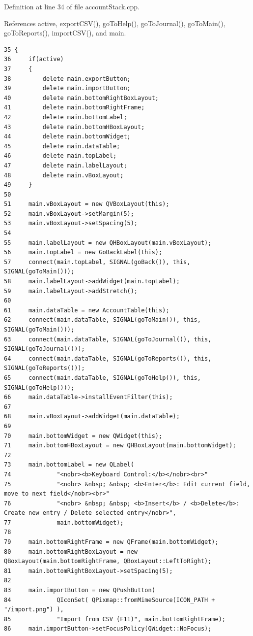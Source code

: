 Definition at line 34 of file account\-Stack.cpp.

References active, export\-CSV(), go\-To\-Help(), go\-To\-Journal(), go\-To\-Main(), go\-To\-Reports(), import\-CSV(), and main.

\footnotesize\begin{verbatim}35 {
36     if(active)
37     {
38         delete main.exportButton;
39         delete main.importButton;
40         delete main.bottomRightBoxLayout;
41         delete main.bottomRightFrame;
42         delete main.bottomLabel;
43         delete main.bottomHBoxLayout;
44         delete main.bottomWidget;
45         delete main.dataTable;
46         delete main.topLabel;
47         delete main.labelLayout;
48         delete main.vBoxLayout;
49     }
50     
51     main.vBoxLayout = new QVBoxLayout(this);
52     main.vBoxLayout->setMargin(5);
53     main.vBoxLayout->setSpacing(5);
54     
55     main.labelLayout = new QHBoxLayout(main.vBoxLayout);
56     main.topLabel = new GoBackLabel(this);
57     connect(main.topLabel, SIGNAL(goBack()), this, SIGNAL(goToMain()));
58     main.labelLayout->addWidget(main.topLabel);
59     main.labelLayout->addStretch();
60     
61     main.dataTable = new AccountTable(this);
62     connect(main.dataTable, SIGNAL(goToMain()), this, SIGNAL(goToMain()));
63     connect(main.dataTable, SIGNAL(goToJournal()), this, SIGNAL(goToJournal()));
64     connect(main.dataTable, SIGNAL(goToReports()), this, SIGNAL(goToReports()));
65     connect(main.dataTable, SIGNAL(goToHelp()), this, SIGNAL(goToHelp()));
66     main.dataTable->installEventFilter(this);
67     
68     main.vBoxLayout->addWidget(main.dataTable);
69     
70     main.bottomWidget = new QWidget(this);
71     main.bottomHBoxLayout = new QHBoxLayout(main.bottomWidget);
72     
73     main.bottomLabel = new QLabel(
74             "<nobr><b>Keyboard Control:</b></nobr><br>"
75             "<nobr> &nbsp; &nbsp; <b>Enter</b>: Edit current field, move to next field</nobr><br>"
76             "<nobr> &nbsp; &nbsp; <b>Insert</b> / <b>Delete</b>: Create new entry / Delete selected entry</nobr>",
77             main.bottomWidget);
78     
79     main.bottomRightFrame = new QFrame(main.bottomWidget);
80     main.bottomRightBoxLayout = new QBoxLayout(main.bottomRightFrame, QBoxLayout::LeftToRight);
81     main.bottomRightBoxLayout->setSpacing(5);
82     
83     main.importButton = new QPushButton(
84             QIconSet( QPixmap::fromMimeSource(ICON_PATH + "/import.png") ),
85             "Import from CSV (F11)", main.bottomRightFrame);
86     main.importButton->setFocusPolicy(QWidget::NoFocus);

\end{verbatim}
